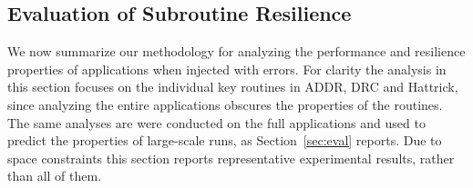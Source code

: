 \documentclass[10pt, conference, compsocconf]{IEEEtran}
\begin{document}
\vspace{-10pt}
\subsection{Evaluation of Subroutine Resilience}
\vspace{-10pt}
\label{sec:res_tech:eval}

We now summarize our methodology for analyzing the performance and resilience properties of applications when injected with errors.
For clarity the analysis in this section focuses on the individual key routines in ADDR, DRC and Hattrick, since analyzing the entire applications obscures the properties of the routines.
The same analyses are were conducted on the full applications and used to predict the properties of large-scale runs, as Section~\ref{sec:eval} reports.
Due to space constraints this section reports representative experimental results, rather than all of them.
\end{document}
